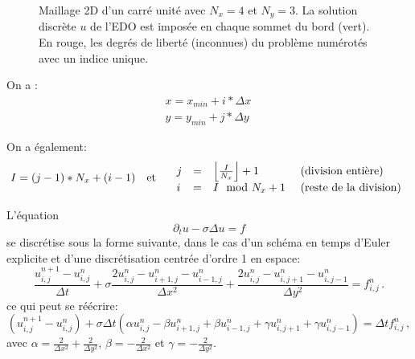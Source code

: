 \documentclass[11pt]{article}
\begin{document}
\begin{figure}[!ht]
\caption{Maillage 2D d'un carré unité avec $N_x = 4$ et $N_y = 3$. La solution discrète $u$ de l'EDO est imposée en chaque sommet du bord (vert). En rouge, les degrés de liberté (inconnues) du problème numérotés avec un indice unique.}
\label{fig:mesh}
\end{figure}

On a : 
\begin{eqnarray*}
  x = x_{min} + i*\Delta x \, \\
  y = y_{min} + j*\Delta y \,
\end{eqnarray*}

On a également:
\begin{equation}
   I = (j-1)*N_x + (i-1) \textrm{\quad et \quad}
\begin{array}{lcll}
   j &=& \left\lfloor \frac{I}{N_x}\right\rfloor + 1 &\textrm{\ (division entière)}\\
   i &=& I \mod {N_x} + 1  &\textrm{\ (reste de la division)}
\end{array}
\label{eq:transfoIndices}
\end{equation}



L'équation 
\begin{equation}
	\partial_t u - \sigma \Delta u = f
\end{equation}
se discrétise sous la forme suivante, dans le cas d'un schéma en temps d'Euler explicite et d'une discrétisation centrée d'ordre 1 en espace:
\begin{equation}
  \frac{u^{n+1}_{i,j}-u^{n}_{i,j}}{\Delta t} + \sigma \frac{2u^{n}_{i,j}-u^{n}_{i+1,j}-u^{n}_{i-1,j}}{\Delta x^2} + \frac{2u^{n}_{i,j} - u^{n}_{i,j+1} - u^{n}_{i,j-1}}{\Delta y^2} = f^{n}_{i,j} \,.
\label{eq:discrete}
\end{equation}
ce qui peut se réécrire:
\begin{equation}
 (u^{n+1}_{i,j}-u^{n}_{i,j}) + \sigma\Delta t\left(\alpha u^{n}_{i,j} - \beta u^{n}_{i+1,j} +  \beta u^{n}_{i-1,j} + \gamma u^{n}_{i,j+1} +  \gamma u^{n}_{i,j-1}\right) = \Delta t f^{n}_{i,j} \,,
\label{eq:discrete2}
\end{equation}
avec $\alpha = \frac{2}{\Delta x^2} + \frac{2}{\Delta y^2}$, $\beta = -\frac{2}{\Delta x^2}$ et $\gamma = -\frac{2}{\Delta y^2}$.
\end{document}
